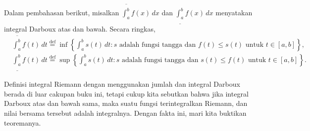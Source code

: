 \documentclass[12pt,openany]{book}
\theoremstyle{plain}
\theoremstyle{remark}
\theoremstyle{definition}
\theoremstyle{exercise}
\theoremstyle{example}
\begin{document}
Dalam pembahasan berikut, misalkan 
$\overline{\int_a^b} f(x)\, dx$ dan 
$\underline{\int_a^b} f(x)\, dx$ menyatakan integral Darboux atas dan bawah.
Secara ringkas,
\begin{align*}
& \overline{\int_a^b} f(t) \,dt
\overset{\text{def}}{=}
\inf \left\{ \int_a^b s(t) \, dt : s
\text{ adalah fungsi tangga dan } f(t) \leq s(t) \text{ untuk } t \in
[a,b] \right\} ,
\\
& \underline{\int_a^b} f(t) \,dt
\overset{\text{def}}{=}
\sup \left\{ \int_a^b s(t) \, dt : s
\text{ adalah fungsi tangga dan } s(t) \leq f(t) \text{ untuk } t \in
[a,b] \right\} .
\end{align*}


Definisi integral Riemann dengan menggunakan jumlah dan integral Darboux
berada di luar cakupan buku ini, tetapi cukup kita sebutkan bahwa 
jika integral Darboux atas dan bawah sama, maka suatu fungsi
terintegralkan Riemann, dan nilai bersama tersebut adalah integralnya.  Dengan fakta ini,
mari kita buktikan teoremanya.
\end{document}

